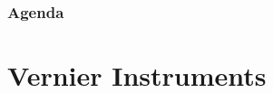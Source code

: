 
\def\PresTitle{Precision Hand Tools}  %
\def\PresSubtitle{Baker College Engineering}         %
\def\PresAuthor{Brad Peirson}               %
\def\PresInstitute{College of Information Technology and Engineering}       %
\def\PresDate{}                             %
\def\PresKeywords{}                         %





\maketitle              %

\begin{frame}
    \frametitle{Agenda}
    \begingroup
        \setlength{\parskip}{0.3em} 
        
        
        \setcounter{tocdepth}{1} %
    \tableofcontents
    \setcounter{tocdepth}{2} %
    \endgroup
\end{frame}

\section{Vernier Instruments}

